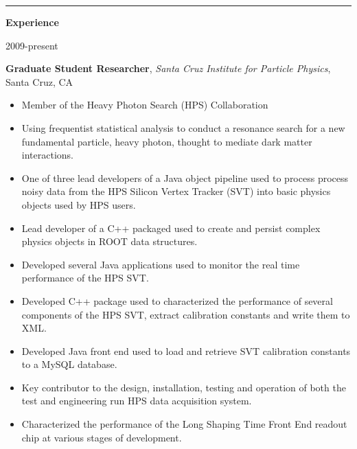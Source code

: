 \documentclass[11pt]{article}
\newcommand{\resumesection}[1] {
    \vspace{20pt}
    \noindent
    \textcolor{MidnightBlue!50!White}{\rule{.15\textwidth}{5pt} \hspace{0.05} \textbf{\large{#1}}} \newline
}
\newcommand{\experienceentry}[5] { 
    \noindent
    \begin{minipage}[t]{0.15\textwidth} \begin{flushright} #1 \end{flushright} \end{minipage} \hspace{0.05}
    \begin{minipage}[t]{0.85\textwidth} 
        \textbf{#2}, \emph{#3}, #4 
        #5
    \end{minipage}
}
\begin{document}
    \resumesection{Experience}
        \experienceentry{2009-present}
                        {Graduate Student Researcher}
                        {Santa Cruz Institute for Particle Physics}
                        {Santa Cruz, CA}
                        {
                          \begin{itemize}[noitemsep, nolistsep, leftmargin=*]
                              \item Member of the Heavy Photon Search (HPS) Collaboration
                              \item Using frequentist statistical analysis to conduct a resonance search for a new
                                    fundamental particle, heavy photon, thought to mediate dark matter 
                                    interactions.
                              \item One of three lead developers of a Java object pipeline used to process process
                                    noisy data from the HPS Silicon Vertex Tracker (SVT) into basic physics objects
                                    used by HPS users.
                              \item Lead developer of a C++ packaged used to create and persist complex physics 
                                    objects in ROOT data structures.
                              \item Developed several Java applications used to monitor the real time performance
                                    of the HPS SVT.
                              \item Developed C++ package used to characterized the performance of several components
                                    of the HPS SVT, extract calibration constants and write them to XML.
                              \item Developed Java front end used to load and retrieve SVT calibration constants to a
                                    MySQL database.
                              \item Key contributor to the design, installation, testing and operation of both the 
                                    test and engineering run HPS data acquisition system.
                              \item Characterized the performance of the Long Shaping Time Front End readout chip at
                                    various stages of development.
                          \end{itemize}
                        }
\end{document}
